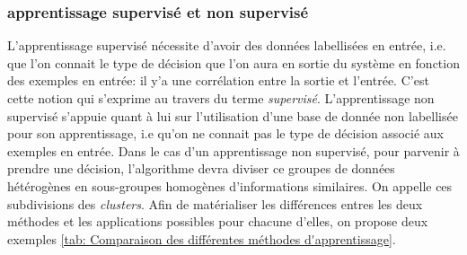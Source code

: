 \subsubsection{apprentissage supervisé et non supervisé} 
\label{Le Machine Learning: Généralités sur le Machine Learning: Le modèle: apprentissage supervisé et non supervisé}
L'apprentissage supervisé nécessite d'avoir des données labellisées en entrée, i.e. que l'on connait le type de décision que l'on aura en sortie du système en fonction des exemples en entrée: il y'a une corrélation entre la sortie et l'entrée. C'est cette notion qui s'exprime au travers du terme \emph{supervisé}. 
L'apprentissage non supervisé s'appuie quant à lui sur l'utilisation d'une base de donnée non labellisée pour son apprentissage, i.e qu'on ne connait pas le type de décision associé aux exemples en entrée. Dans le cas d'un apprentissage non supervisé, pour parvenir à prendre une décision, l'algorithme devra diviser ce groupes de données hétérogènes en sous-groupes homogènes d'informations similaires. On appelle ces subdivisions des \emph{clusters}.
Afin de matérialiser les différences entres les deux méthodes et les applications possibles pour chacune d'elles, on propose deux exemples \ref {tab: Comparaison des différentes méthodes d'apprentissage}.

